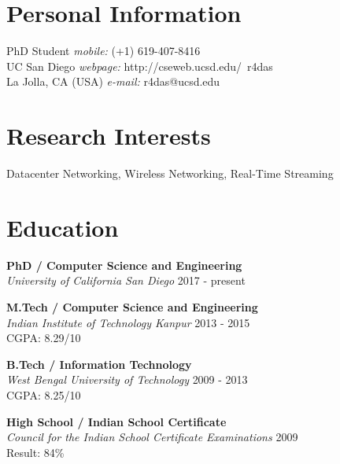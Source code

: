 \documentclass[margin,line]{res}
\begin{document}

\begin{resume}
\section{\sc Personal Information}

PhD Student            {\hfill {\it mobile:}  (+1) 619-407-8416} \\       
  UC San Diego    {\hfill{\it webpage:} http://cseweb.ucsd.edu/~r4das}
    \\              
La Jolla, CA (USA)
    {\hfill {\it e-mail:}  r4das@ucsd.edu}\\     



\section{\sc Research Interests}
Datacenter Networking, Wireless Networking, Real-Time Streaming

\section{\sc Education}

{\bf PhD / Computer Science and Engineering} \\
{\em University of California San Diego }{\hfill}2017 - present \\
\vspace*{-.1in}
\vspace*{.05in}

{\bf M.Tech / Computer Science and Engineering} \\
{\em Indian Institute of Technology Kanpur }{\hfill}2013 - 2015 \\
\vspace*{-.1in}
CGPA: 8.29/10
\vspace*{.05in}

{\bf B.Tech / Information Technology} \\
{\em West Bengal University of Technology }{\hfill}2009 - 2013 \\
\vspace*{-.1in}
CGPA: 8.25/10
\vspace*{.05in}

{\bf High School / Indian School Certificate} \\
{\em Council for the Indian School Certificate Examinations }{\hfill}2009 \\
\vspace*{-.1in}
Result: 84\%
\vspace*{.05in}


\end{resume}
\end{document}
